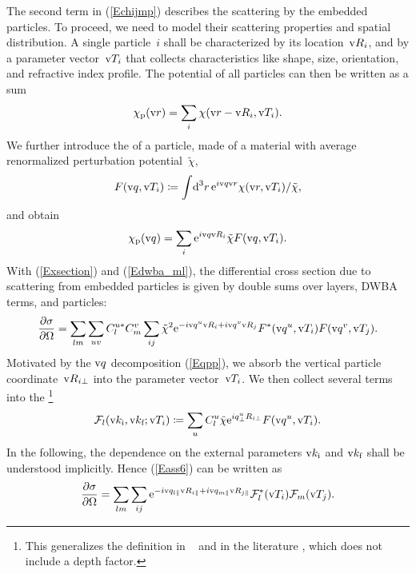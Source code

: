 The second term in (\ref{Echijmp}) describes the scattering
by the embedded particles.
To proceed, we need to model their scattering properties
and spatial distribution.
A single particle~$i$ shall be characterized by its location~$\text{v}{R}_i$,
and by a parameter vector~$\text{v}{T}_i$ that collects
characteristics like shape, size, orientation, and refractive index profile.
The potential of all particles can then be written as a sum
\begin{equation}
  \chi_\text{p}(\text{v}{r}) = \sum_i \chi(\text{v}{r}-\text{v}{R}_i,\text{v}{T}_i).
\end{equation}
We further introduce the 
%
of a particle,
made of a material
with average renormalized perturbation potential~$\tilde\chi$,
\begin{equation}\label{EFFdef}
  F(\text{v}{q},\text{v}{T}_i) \coloneqq  \int\!\text{d}^3r\,\text{e}^{i\text{v}{q}\text{v}{r}}\chi(\text{v}{r},\text{v}{T}_i)/\tilde\chi,
\end{equation}
and obtain
\begin{equation}
  \chi_\text{p}(\text{v}{q}) = \sum_i \text{e}^{i\text{v}{q}\text{v}{R}_i} \tilde\chi F(\text{v}{q},\text{v}{T}_i).
\end{equation}
With (\ref{Exsection}) and (\ref{Edwba_ml}),
the differential cross section due to scattering from embedded particles is
given by double sums over layers, DWBA terms, and particles:
\begin{equation}\label{Eass6}
  \frac{\partial\sigma}{\partial\Omega}
  = \sum_{lm} \sum_{uv} C^{u*}_l C^v_m \sum_{ij} \tilde\chi^2
    \text{e}^{-i\text{v}{q}^u \text{v}{R}_i +i \text{v}{q}^v \text{v}{R}_j} F^*(\text{v}{q}^u,\text{v}{T}_i) F(\text{v}{q}^v,\text{v}{T}_j).
\end{equation}
Motivated by the $\text{v}{q}$ decomposition (\ref{Eqpp}),
we absorb the vertical particle coordinate~$\text{v}{R}_{i\perp}$
into the parameter vector~$\text{v}{T}_i$.
We then collect several terms into the \footnote
{This generalizes the definition in \IsGISAXS\ \cite[Sec.~2.4.1]{Laz08}
  and in the literature \cite[p.~292]{ReLL09},
which does not include a depth factor.}
\begin{equation}
  \mathcal{F}_l(\text{v}{k}_{\text{i}},\text{v}{k}_{\text{f}};\text{v}{T}_i)
  \coloneqq  \sum_u C^u_l\tilde\chi \text{e}^{iq^u_\perp R_{i\perp}} F(\text{v}{q}^u,\text{v}{T}_i).
\end{equation}
In the following, the dependence on the external parameters
$\text{v}{k}_{\text{i}}$ and $\text{v}{k}_{\text{f}}$ shall be understood implicitly.
Hence (\ref{Eass6}) can be written as
\begin{equation}\label{Eass4}
  \frac{\partial\sigma}{\partial\Omega}
  = \sum_{lm} \sum_{ij} \text{e}^{-i\text{v}{q}_{l\parallel}\text{v}{R}_{i\parallel}+i\text{v}{q}_{m\parallel}\text{v}{R}_{j\parallel}}
    \mathcal{F}^*_l(\text{v}{T}_i) \mathcal{F}_m(\text{v}{T}_j).
\end{equation}

